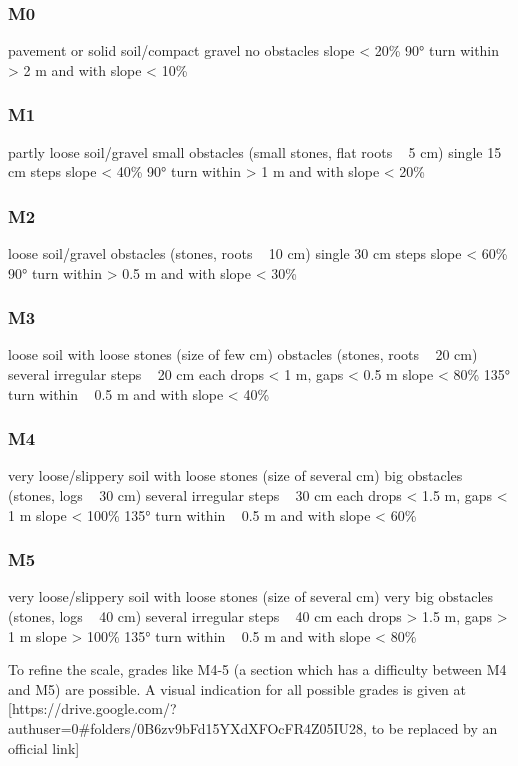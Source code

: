 \subsubsection{M0}
pavement or solid soil/compact gravel
no obstacles
slope < 20\%
90° turn within > 2 m and with slope < 10\%

\subsubsection{M1}
partly loose soil/gravel
small obstacles (small stones, flat roots ~ 5 cm)
single 15 cm steps
slope < 40\%
90° turn within > 1 m and with slope < 20\%

\subsubsection{M2}
loose soil/gravel
obstacles (stones, roots ~ 10 cm)
single 30 cm steps
slope < 60\%
90° turn within > 0.5 m and with slope < 30\%

\subsubsection{M3}
loose soil with loose stones (size of few cm)
obstacles (stones, roots ~ 20 cm)
several irregular steps ~ 20 cm each
drops < 1 m, gaps < 0.5 m
slope < 80\%
135° turn within ~ 0.5 m and with slope < 40\%

\subsubsection{M4}
very loose/slippery soil with loose stones (size of several cm)
big obstacles (stones, logs ~ 30 cm)
several irregular steps ~ 30 cm each
drops < 1.5 m, gaps < 1 m
slope < 100\%
135° turn within ~ 0.5 m and with slope < 60\%

\subsubsection{M5}
very loose/slippery soil with loose stones (size of several cm)
very big obstacles (stones, logs ~ 40 cm)
several irregular steps ~ 40 cm each
drops > 1.5 m, gaps > 1 m
slope > 100\%
135° turn within ~ 0.5 m and with slope < 80\%

To refine the scale, grades like M4-5 (a section which has a difficulty between
M4 and M5) are possible. A visual indication for all possible grades is given at
[https://drive.google.com/?authuser=0#folders/0B6zv9bFd15YXdXFOcFR4Z05IU28, to
be replaced by an official link]


